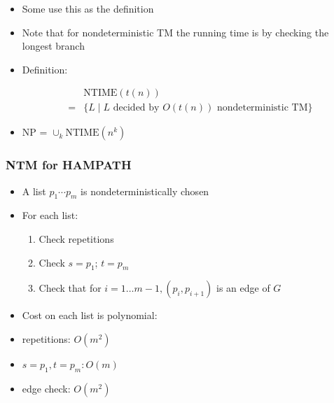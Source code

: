 \begin{frame}[allowframebreaks]
\begin{itemize}
\item Some use this as the definition

\item Note that for nondeterministic TM the running time is by checking the longest branch

\item Definition:

  \begin{equation*}
    \begin{split}
      & \text{NTIME}(t(n)) \\
      =& \{L\mid L
\text{ decided by } O(t(n))
\text{ nondeterministic TM}\}
\end{split}
\end{equation*}
\item NP = $\cup_k \text{NTIME}(n^k)$

\end{itemize}\end{frame} \begin{frame}[allowframebreaks] \frametitle{NTM for HAMPATH}
  \begin{itemize}
\item A list $p_1\cdots p_m$ is nondeterministically chosen

\item For each list:

  \begin{enumerate}
  \item  Check repetitions
  \item Check $s=p_1$; $t=p_m$
\item Check that for $i=1 \ldots m-1, (p_i, p_{i+1})$ is an edge of $G$
  \end{enumerate}
\item Cost on each list is polynomial:

  
\item [] repetitions: $O(m^2)$

\item [] $s=p_1, t = p_m: O(m)$

\item [] edge check: $O(m^2)$

\end{itemize}\end{frame}



